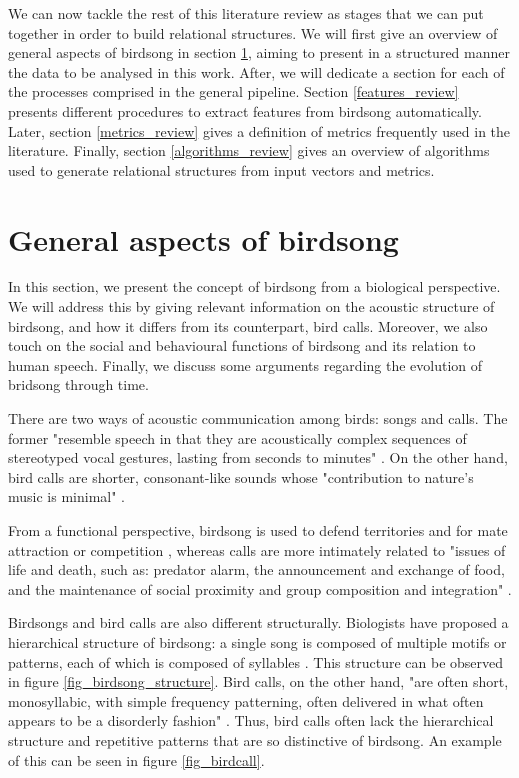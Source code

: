\documentclass[../main.tex]{subfiles}
\begin{document}
\par We can now tackle the rest of this literature review as stages that we can put together in order to build relational structures. We will first give an overview of general aspects of birdsong in section \ref{birdsong_review}, aiming to present in a structured manner the data to be analysed in this work. After, we will dedicate a section for each of the processes comprised in the general pipeline. Section \ref{features_review} presents different procedures to extract features from birdsong automatically. Later, section \ref{metrics_review} gives a definition of metrics frequently used in the literature. Finally, section \ref{algorithms_review} gives an overview of algorithms used to generate relational structures from input vectors and metrics.

\section{General aspects of birdsong} \label{birdsong_review}
In this section, we present the concept of birdsong from a biological perspective. We will address this by giving relevant information on the acoustic structure of birdsong, and how it differs from its counterpart, bird calls. Moreover, we also touch on the social and behavioural functions of birdsong and its relation to human speech. Finally, we discuss some arguments regarding the evolution of bridsong through time.
\par There are two ways of acoustic communication among birds: songs and calls. The former "resemble speech in that they are acoustically complex sequences of stereotyped vocal gestures, lasting from seconds to minutes" \cite{Snowdon2013}. On the other hand, bird calls are shorter, consonant-like sounds whose "contribution to nature's music is minimal" \cite{Marler2004}. 
\par From a functional perspective, birdsong is used to defend territories and for mate attraction or competition \cite{Berwick2013} \cite{Naguib2014}, whereas calls are more intimately related to "issues of life and death, such as: predator alarm, the announcement and exchange of food, and the maintenance of social proximity and group composition and integration" \cite{Marler2004}.
\par Birdsongs and bird calls are also different structurally. Biologists have proposed a hierarchical structure of birdsong: a single song is composed of multiple motifs or patterns, each of which is composed of syllables \cite{Snowdon2013}. This structure can be observed in figure \ref{fig_birdsong_structure}. Bird calls, on the other hand, "are often short, monosyllabic, with simple frequency patterning, often delivered in what often appears to be a disorderly fashion" \cite{Marler2004}. Thus, bird calls often lack the hierarchical structure and repetitive patterns that are so distinctive of birdsong. An example of this can be seen in figure \ref{fig_birdcall}.
\end{document}
